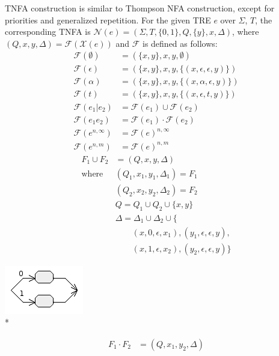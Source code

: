 \documentclass{article}
\newenvironment{Xfig}
    {\par\medskip\noindent\minipage{\linewidth}\begin{center}}
    {\end{center}\endminipage\par\medskip}
\newcommand{\Xeq}{\!=\!}
\newcommand{\XF}{\mathcal{F}}
\newcommand{\XN}{\mathcal{N}}
\newcommand{\XX}{\mathcal{X}}
\theoremstyle{definition}
\begin{document}
\begin{multicols}{2}
TNFA construction is similar to Thompson NFA construction,
except for priorities and generalized repetition.
For the given TRE $e$ over $\Sigma$, $T$, the corresponding TNFA is $\XN(e) \Xeq (\Sigma, T, \{0, 1\}, Q, \{ y \}, x, \Delta)$,
where $(Q, x, y, \Delta) \Xeq \XF(\XX(e))$ and $\XF$ is defined as follows:
    \begin{align*}
        \XF(\emptyset) &= (\{ x, y \}, x, y, \emptyset) \\
        \XF(\epsilon) &= (\{ x, y \}, x, y, \{ (x, \epsilon, \epsilon, y) \}) \\
        \XF(\alpha) &= (\{ x, y \}, x, y, \{ (x, \alpha, \epsilon, y) \}) \\
        \XF(t) &= (\{ x, y \}, x, y, \{ (x, \epsilon, t, y) \}) \\
        \XF(e_1 | e_2) &= \XF(e_1) \cup \XF(e_2) \\
        \XF(e_1 e_2) &= \XF(e_1) \cdot \XF(e_2) \\
        \XF(e^{n,\infty}) &= \XF(e)^{n,\infty} \\
        \XF(e^{n,m}) &= \XF(e)^{n, m}
    \end{align*}
%
    \begin{align*}
        F_1 \cup F_2 &= (Q, x, y, \Delta) \\
        \text{where }
            & (Q_1, x_1, y_1, \Delta_1) = F_1 \\
            & (Q_2, x_2, y_2, \Delta_2) = F_2 \\
            & Q = Q_1 \cup Q_2 \cup \{ x, y \} \\
            & \Delta = \Delta_1 \cup \Delta_2 \cup \{ \\
                & \qquad (x, 0, \epsilon, x_1), (y_1, \epsilon, \epsilon, y), \\
                & \qquad (x, 1, \epsilon, x_2), (y_2, \epsilon, \epsilon, y) \}
    \end{align*}
%
\begin{Xfig}
\includegraphics[width=0.3\linewidth]{img/tnfa/union.png}\\*
\end{Xfig}
%
    \begin{align*}
        F_1 \cdot F_2 &= (Q, x_1, y_2, \Delta) \\

\end{align*}
\end{multicols}
\end{document}
